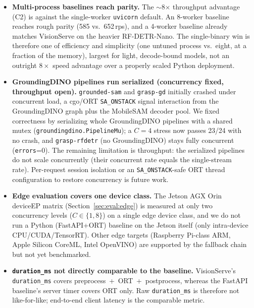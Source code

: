 \begin{itemize}
    \item \textbf{Multi-process baselines reach parity.}
          The $\sim$8$\times$ throughput advantage (C2) is against the single-worker
          \texttt{uvicorn} default. An 8-worker baseline reaches rough parity (585 vs.\ 652\,rps),
          and a 4-worker baseline already matches VisionServe on the heavier RF-DETR-Nano. The
          single-binary win is therefore one of efficiency and simplicity (one untuned
          process vs.\ eight, at a fraction of the memory), largest for light, decode-bound
          models, not an outright $8\times$ speed advantage over a properly scaled Python
          deployment.

    \item \textbf{GroundingDINO pipelines run serialized (concurrency fixed, throughput open).}
          \texttt{grounded-sam} and \texttt{grasp-gd} initially crashed under concurrent load, a
          cgo/ORT \texttt{SA\_ONSTACK} signal interaction from the GroundingDINO graph plus the
          MobileSAM decoder pool. We fixed correctness by serializing whole GroundingDINO
          pipelines with a shared mutex (\texttt{groundingdino.PipelineMu}); a $C{=}4$ stress now
          passes 23/24 with no crash, and \texttt{grasp-rfdetr} (no GroundingDINO) stays fully
          concurrent (\texttt{errors}=0). The remaining limitation is throughput: the
          serialized pipelines do not scale concurrently (their concurrent rate equals the
          single-stream rate). Per-request session isolation or an \texttt{SA\_ONSTACK}-safe ORT
          thread configuration to restore concurrency is future work.

    \item \textbf{Edge evaluation covers one device class.}
          The Jetson AGX Orin device\texttimes EP matrix (Section~\ref{sec:eval:edge}) is measured
          at only two concurrency levels ($C\in\{1,8\}$) on a single edge device class, and we do
          not run a Python (FastAPI+ORT) baseline on the Jetson itself (only intra-device
          CPU/CUDA/TensorRT). Other edge targets (Raspberry Pi-class ARM, Apple Silicon CoreML,
          Intel OpenVINO) are supported by the fallback chain but not yet benchmarked.

    \item \textbf{\texttt{duration\_ms} not directly comparable to the baseline.}
          VisionServe's \texttt{duration\_ms} covers preprocess~+~ORT~+~postprocess,
          whereas the FastAPI baseline's server timer covers ORT only. Raw
          \texttt{duration\_ms} is therefore not like-for-like; end-to-end client latency
          is the comparable metric.


\end{itemize}

